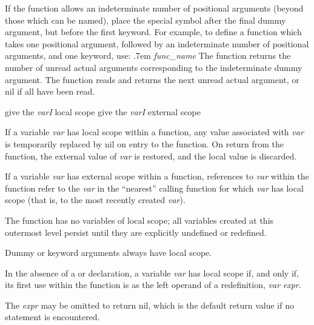If the function allows an indeterminate number of positional arguments
(beyond those which can be named), place the special symbol  after
the final dummy argument, but before the first keyword.  For example, to
define a function which takes one positional argument, followed by an
indeterminate number of positional arguments, and one keyword, use:
\hfil\break
\indf\hglue.7em {\it func\_name\/}\kbd{)}
\hfil\break
The function  returns the number of unread actual
arguments corresponding to the  indeterminate dummy argument.
The function  reads and returns the next unread actual
argument, or nil if all have been read.


       {give the {\it varI} local scope}
       {give the {\it varI} external scope}

If a variable {\it var} has local scope within a function, any value
associated with {\it var} is temporarily replaced by nil on entry to
the function.  On return from the function, the external value of {\it
var} is restored, and the local value is discarded.

If a variable {\it var} has external scope within a function,
references to {\it var} within the function refer to the {\it var} in
the ``nearest'' calling function for which {\it var} has local scope
(that is, to the most recently created {\it var}).

The  function has no variables of local scope; all
variables created at this outermost level persist until they are
explicitly undefined or redefined.

Dummy or keyword arguments always have local scope.

In the absence of a  or  declaration, a variable
{\it var} has local scope if, and only if, its first use within the
function is as the left operand of a redefinition, {\it var\/}\kbd{=}
{\it expr}.


The {\it expr} may be omitted to return nil, which is the default
return value if no  statement is encountered.


